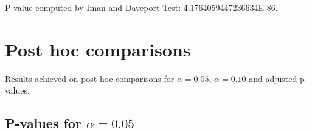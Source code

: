 \documentclass[a4paper,10pt]{article}
\begin{document}
\begin{landscape}
P-value computed by Iman and Daveport Test: 4.1764059447236634E-86.\newline



\pagebreak

\section{Post hoc comparisons}

Results achieved on post hoc comparisons for $\alpha = 0.05$, $\alpha = 0.10$ and adjusted p-values.

\subsection{P-values for $\alpha=0.05$}


\end{landscape}
\end{document}
